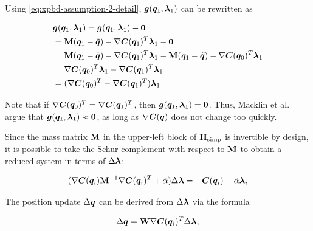 \noindent Using \autoref{eq:xpbd-assumption-2-detail}, $\bm{g}(\bm{q}_1, \bm{\lambda}_1)$ can be rewritten as

\begin{equation}
\begin{split}
    &\bm{g}(\bm{q}_1, \bm{\lambda}_1) = \bm{g}(\bm{q}_1, \bm{\lambda}_1) - \bm{0} \\
    &= \mathbf{M}(\bm{q}_1 - \tilde{\bm{q}}) - \nabla \bm{C}(\bm{q}_1)^T \bm{\lambda}_1 - \bm{0} \\
    &= \mathbf{M}(\bm{q}_1 - \tilde{\bm{q}}) - \nabla \bm{C}(\bm{q}_1)^T \bm{\lambda}_1 
    - \mathbf{M}(\bm{q}_1 - \tilde{\bm{q}}) - \nabla \bm{C}(\bm{q}_0)^T \bm{\lambda}_1 \\
    &= \nabla \bm{C}(\bm{q}_0)^T \bm{\lambda}_1 - \nabla \bm{C}(\bm{q}_1)^T \bm{\lambda}_1 \\
    &= (\nabla \bm{C}(\bm{q}_0)^T - \nabla \bm{C}(\bm{q}_1)^T) \bm{\lambda}_1
\end{split}
\end{equation}

\noindent Note that if $\nabla \bm{C}(\bm{q}_0)^T = \nabla \bm{C}(\bm{q}_1)^T$, then 
$\bm{g}(\bm{q}_1, \bm{\lambda}_1) = \bm{0}$. Thus, Macklin et al.\ \cite{macklin2016} argue that 
$\bm{g}(\bm{q}_1, \bm{\lambda}_1) \approx \bm{0}$, as long as $\nabla \bm{C}(\bm{q})$ 
does not change too quickly.

Since the mass matrix $\mathbf{M}$ in the upper-left block of $\mathbf{H}_{\text{simp}}$ is invertible by design, it is possible
to take the Schur complement with respect to $\mathbf{M}$ to obtain a reduced system in terms of $\Delta \bm{\lambda}$:

\begin{equation}\label{eq:xpbd-schur}
    (\nabla \bm{C}(\bm{q}_i) \mathbf{M}^{-1} \nabla \bm{C}(\bm{q}_i)^T + \tilde{\mathbf{\alpha}}) \Delta \bm{\lambda} = -\bm{C}(\bm{q}_i) - 
    \tilde{\mathbf{\alpha}}\bm{\lambda}_i
\end{equation}

\noindent The position update $\Delta \bm{q}$ can be derived from $\Delta \bm{\lambda}$ via the formula

\begin{equation}\label{eq:xpbd-position-update}
    \Delta \bm{q} = \mathbf{W} \nabla \bm{C}(\bm{q}_i)^T \Delta \bm{\lambda},
\end{equation}

